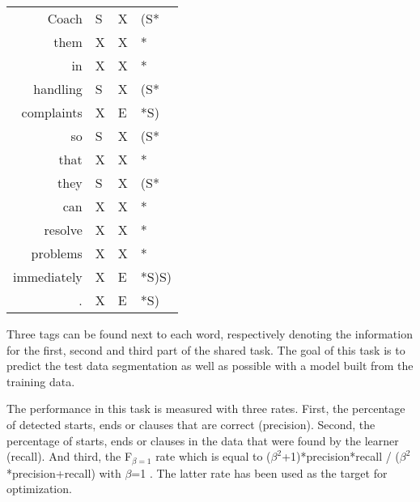 \begin{center}
\begin{tabular}{rlll}
Coach&S&X&(S* \\
them&X&X&* \\
in&X&X&* \\
handling&S&X&(S* \\
complaints&X&E&*S) \\
so&S&X&(S* \\
that&X&X&* \\
they&S&X&(S* \\
can&X&X&* \\
resolve&X&X&* \\
problems&X&X&* \\
immediately&X&E&*S)S)  \\
.&X&E&*S)
\end{tabular}
\end{center}

\noindent
Three tags can be found next to each word, respectively denoting the
information for the first, second and third part of the shared task.
The goal of this task is to predict the test data segmentation as
well as possible with a model built from the training data.

The performance in this task is measured with three rates.
First, the percentage of detected starts, ends or clauses 
that are correct (precision). 
Second, the percentage of starts, ends or clauses in the data that
were found by the learner (recall).
And third, the F$_{\beta=1}$ rate which is equal to
($\beta^2$+1)*precision*recall / ($\beta^2$*precision+recall)
with $\beta$=1
\cite{vanrijsbergen75}.
The latter rate has been used as the target for 
optimization.

